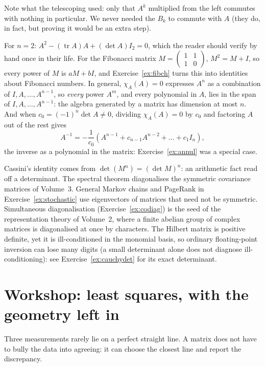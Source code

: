 Note what the telescoping used: only that $A^k$ multiplied from the left commutes with nothing in particular. We never needed the $B_k$ to commute with $A$ (they do, in fact, but proving it would be an extra step).

\begin{examplex}
For $n=2$: $A^2-(\operatorname{tr}A)A+(\det A)I_2=0$, which the reader should verify by hand once in their life. For the Fibonacci matrix $M=\begin{pmatrix}1&1\\1&0\end{pmatrix}$, $M^2=M+I$, so every power of $M$ is $aM+bI$, and Exercise~\ref{ex:fibch} turns this into identities about Fibonacci numbers. In general, $\chi_A(A)=0$ expresses $A^n$ as a combination of $I,A,\dots,A^{n-1}$, so \emph{every} power $A^m$, and every polynomial in $A$, lies in the span of $I,A,\dots,A^{n-1}$: the algebra generated by a matrix has dimension at most $n$. And when $c_0=(-1)^n\det A\ne0$, dividing $\chi_A(A)=0$ by $c_0$ and factoring $A$ out of the rest gives
\[
A^{-1}=-\frac1{c_0}\left(A^{n-1}+c_{n-1}A^{n-2}+\dots+c_1I_n\right),
\]
the inverse as a polynomial in the matrix: Exercise~\ref{ex:annul} was a special case.
\end{examplex}

\begin{beauty}
Cassini's identity comes from $\det(M^n)=(\det M)^n$: an arithmetic fact read off a determinant. The spectral theorem diagonalises the symmetric covariance matrices of
Volume~3. General Markov chains and PageRank in Exercise~\ref{ex:stochastic} use eigenvectors of matrices that need not be symmetric. Simultaneous diagonalisation (Exercise~\ref{ex:codiag}) is the
seed of the representation theory of Volume~2, where a finite abelian group of complex matrices is diagonalised at once by characters.
The Hilbert matrix is positive definite, yet it is ill-conditioned in the monomial basis, so ordinary floating-point inversion can lose many digits (a small determinant alone does not diagnose ill-conditioning): see Exercise~\ref{ex:cauchydet} for its exact determinant.
\end{beauty}


\section{Workshop: least squares, with the geometry left in}
Three measurements rarely lie on a perfect straight line. A matrix does not have to bully the data into agreeing: it can choose the closest line and report the discrepancy.

